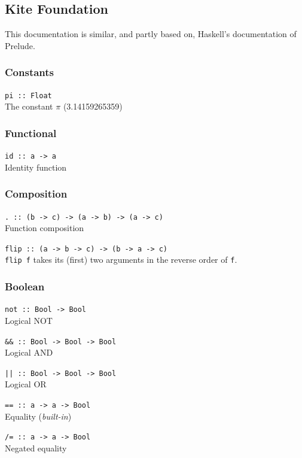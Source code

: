 
\subsection{Kite Foundation}

This documentation is similar, and partly based on, Haskell's
documentation of Prelude.

\subsubsection{Constants}

\texttt{pi :: Float}\ \\
The constant $\pi$ (3.14159265359)


\subsubsection{Functional}

\texttt{id :: a -> a}\ \\
Identity function


\subsubsection{Composition}

\texttt{{.} :: (b -> c) -> (a -> b) -> (a -> c)}\ \\
Function composition

\texttt{flip :: (a -> b -> c) -> (b -> a -> c)}\ \\
\texttt{flip f} takes its (first) two arguments in the reverse order of \texttt{f}.


\subsubsection{Boolean}

\texttt{not :: Bool -> Bool}\ \\
Logical NOT

\texttt{{\&\&} :: Bool -> Bool -> Bool}\ \\
Logical AND

\texttt{{||} :: Bool -> Bool -> Bool}\ \\
Logical OR

\texttt{{==} :: a -> a -> Bool}\ \\
Equality (\emph{built-in})

\texttt{{/=} :: a -> a -> Bool}\ \\
Negated equality

